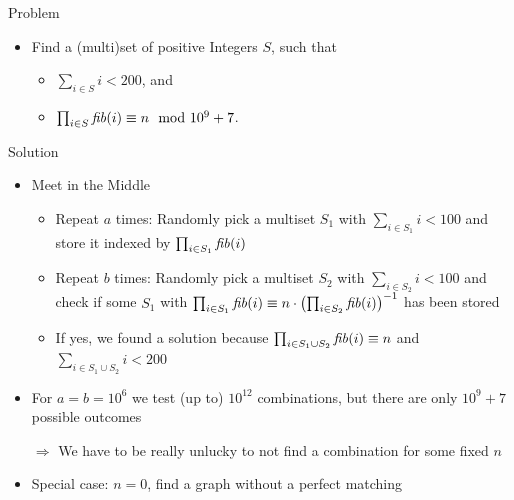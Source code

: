 \begin{frame}
  \frametitle{\problemtitle}
  \begin{block}{Problem}
  	\begin{itemize}
		\item Find a (multi)set of positive Integers $S$, such that
	  	\begin{itemize}
			\item $\sum_{i\in S} i < 200$, and
			\item $\prod_{i\in S} \mathit{fib}(i) \equiv n \mod 10^9+7$.
	  	\end{itemize}
	  \end{itemize}
  \end{block}
  
  \begin{block}{Solution}
    \begin{itemize}
    	\item Meet in the Middle
    	\pause
    	\begin{itemize}
			\item Repeat $a$ times: Randomly pick a multiset $S_1$ with $\sum_{i\in S_1} i < 100$ and store it indexed by $\prod_{i\in S_1} \mathit{fib}(i)$
    		\pause
		\item Repeat $b$ times: Randomly pick a multiset $S_2$ with $\sum_{i\in S_2} i < 100$ and check if some $S_1$ with $\prod_{i\in S_1} \mathit{fib}(i) \equiv n\cdot\left(\prod_{i\in S_2} \mathit{fib}(i)\right)^{-1}$ has been stored
			\item If yes, we found a solution because $\prod_{i\in S_1\cup S_2} \mathit{fib}(i) \equiv n$ and $\sum_{i\in S_1\cup S_2} i < 200$
    	\end{itemize}
    	\pause
	\item For $a=b=10^6$ we test (up to) $10^{12}$ combinations, but there are only $10^9+7$ possible outcomes
    	\item[$\Rightarrow$] We have to be really unlucky to not find a combination for some fixed $n$
    	\pause
    	\item Special case: $n=0$, find a graph without a perfect matching
    \end{itemize}
  \end{block}
\end{frame}
